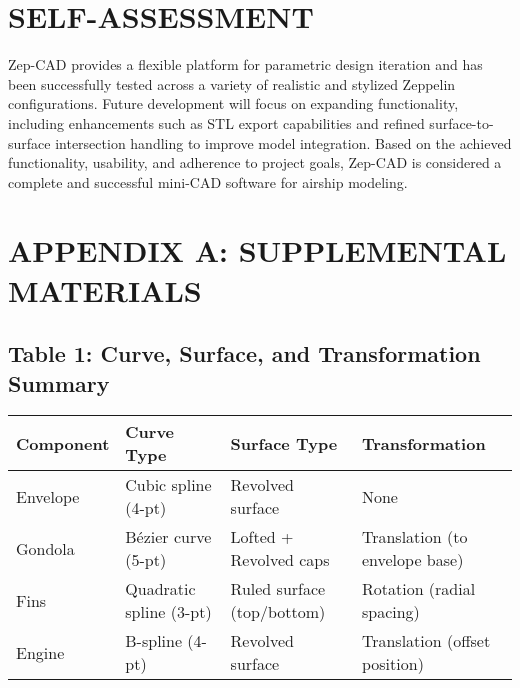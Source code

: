 \documentclass[10pt]{article}
\begin{document}
  \section{SELF-ASSESSMENT}

  Zep-CAD provides a flexible platform for parametric design iteration and has been successfully tested across a 
  variety of realistic and stylized Zeppelin configurations. Future development will focus on expanding 
  functionality, including enhancements such as STL export capabilities and refined surface-to-surface 
  intersection handling to improve model integration. Based on the achieved functionality, usability, and 
  adherence to project goals, Zep-CAD is considered a complete and successful mini-CAD software for airship 
  modeling.
  


\newpage




\newpage


\appendix
\section*{APPENDIX A: SUPPLEMENTAL MATERIALS}

\subsection*{Table 1: Curve, Surface, and Transformation Summary}

\begin{center}
\begin{tabular}{|l|l|l|l|}
\hline
\textbf{Component} & \textbf{Curve Type} & \textbf{Surface Type} & \textbf{Transformation} \\
\hline
Envelope & Cubic spline (4-pt) & Revolved surface & None \\
Gondola & Bézier curve (5-pt) & Lofted + Revolved caps & Translation (to envelope base) \\
Fins & Quadratic spline (3-pt) & Ruled surface (top/bottom) & Rotation (radial spacing) \\
Engine & B-spline (4-pt) & Revolved surface & Translation (offset position) \\
\hline
\end{tabular}
\end{center}

\vspace{1em}
\end{document}
